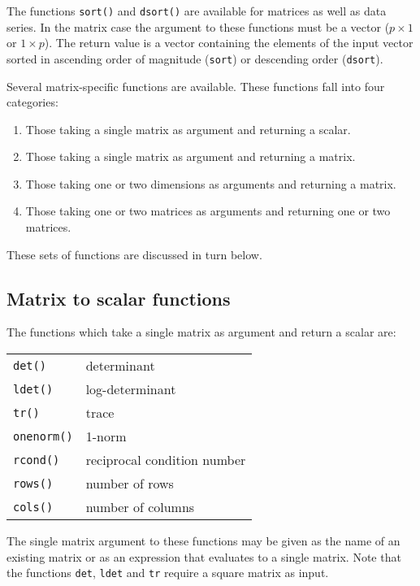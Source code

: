 The functions \texttt{sort()} and \texttt{dsort()} are available for
matrices as well as data series.  In the matrix case the argument to
these functions must be a vector ($p \times 1$ or $1\times p$).  The
return value is a vector containing the elements of the input vector
sorted in ascending order of magnitude (\texttt{sort}) or descending
order (\texttt{dsort}).

Several matrix-specific functions are available.  These functions fall
into four categories:
%
\begin{enumerate}
\item Those taking a single matrix as argument and returning a scalar.
\item Those taking a single matrix as argument and returning a matrix.
\item Those taking one or two dimensions as arguments and
  returning a matrix.
\item Those taking one or two matrices as arguments and returning one
  or two matrices.
\end{enumerate}
%
These sets of functions are discussed in turn below.

\subsection{Matrix to scalar functions}
\label{matrix-to-scalar}

The functions which take a single matrix as argument and return a
scalar are:

\begin{center}
\begin{tabular}{ll}
\texttt{det()} & determinant \\
\texttt{ldet()} & log-determinant \\
\texttt{tr()} & trace \\
\texttt{onenorm()} & 1-norm \\
\texttt{rcond()} & reciprocal condition number \\
\texttt{rows()} & number of rows \\
\texttt{cols()} & number of columns 
\end{tabular}
\end{center}

The single matrix argument to these functions may be given as the name
of an existing matrix or as an expression that evaluates to a single
matrix.  Note that the functions \texttt{det}, \texttt{ldet} and
\texttt{tr} require a square matrix as input.  

